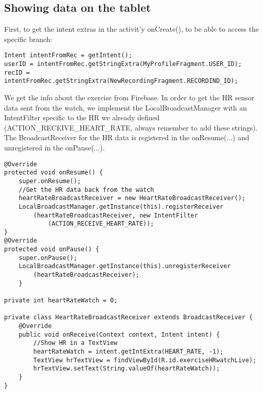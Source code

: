 \documentclass[11pt]{article}
\begin{document}
\subsection{Showing data on the tablet}
First, to get the intent extras in the activit'y onCreate(), to be able to access the specific branch:
\begin{lstlisting}
Intent intentFromRec = getIntent();
userID = intentFromRec.getStringExtra(MyProfileFragment.USER_ID);
recID = intentFromRec.getStringExtra(NewRecordingFragment.RECORDIND_ID);
\end{lstlisting}
We get the info about the exercise from Firebase. %
In order to get the HR sensor data sent from the watch, we implement the LocalBroadcastManager with an IntentFilter specific to the HR we already defined (ACTION_RECEIVE_HEART_RATE, always remember to add these strings). The BroadcastReceiver for the HR data is registered in the onResume(...) and unregistered in the onPause(...).
\begin{lstlisting}
@Override
protected void onResume() {
    super.onResume();
    //Get the HR data back from the watch
    heartRateBroadcastReceiver = new HeartRateBroadcastReceiver();
    LocalBroadcastManager.getInstance(this).registerReceiver
        (heartRateBroadcastReceiver, new IntentFilter
            (ACTION_RECEIVE_HEART_RATE));
}
@Override
protected void onPause() {
    super.onPause();
    LocalBroadcastManager.getInstance(this).unregisterReceiver
        (heartRateBroadcastReceiver);
    }
    
private int heartRateWatch = 0;

private class HeartRateBroadcastReceiver extends BroadcastReceiver {
    @Override
    public void onReceive(Context context, Intent intent) {
        //Show HR in a TextView
        heartRateWatch = intent.getIntExtra(HEART_RATE, -1);
        TextView hrTextView = findViewById(R.id.exerciseHRwatchLive);
        hrTextView.setText(String.valueOf(heartRateWatch));
    }
}
\end{lstlisting}
\end{document}
